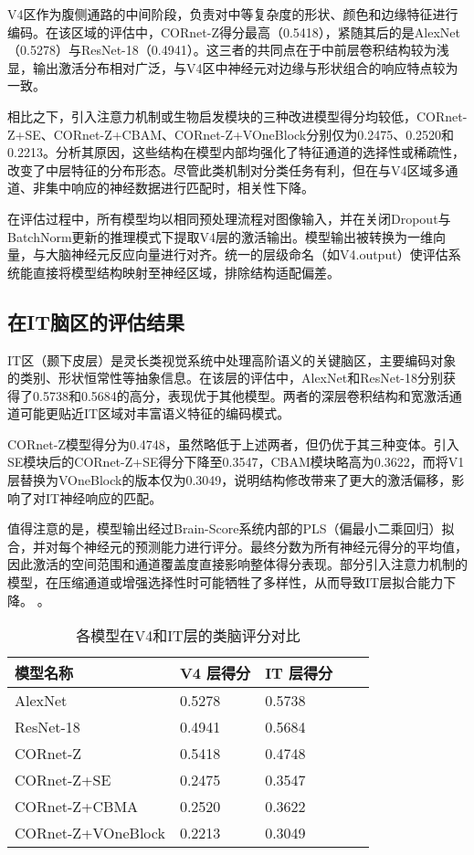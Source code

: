 V4区作为腹侧通路的中间阶段，负责对中等复杂度的形状、颜色和边缘特征进行编码。在该区域的评估中，CORnet-Z得分最高（0.5418），紧随其后的是AlexNet（0.5278）与ResNet-18（0.4941）。这三者的共同点在于中前层卷积结构较为浅显，输出激活分布相对广泛，与V4区中神经元对边缘与形状组合的响应特点较为一致。

相比之下，引入注意力机制或生物启发模块的三种改进模型得分均较低，CORnet-Z+SE、CORnet-Z+CBAM、CORnet-Z+VOneBlock分别仅为0.2475、0.2520和0.2213。分析其原因，这些结构在模型内部均强化了特征通道的选择性或稀疏性，改变了中层特征的分布形态。尽管此类机制对分类任务有利，但在与V4区域多通道、非集中响应的神经数据进行匹配时，相关性下降。

在评估过程中，所有模型均以相同预处理流程对图像输入，并在关闭Dropout与BatchNorm更新的推理模式下提取V4层的激活输出。模型输出被转换为一维向量，与大脑神经元反应向量进行对齐。统一的层级命名（如V4.output）使评估系统能直接将模型结构映射至神经区域，排除结构适配偏差。

\subsection{在IT脑区的评估结果}

IT区（颞下皮层）是灵长类视觉系统中处理高阶语义的关键脑区，主要编码对象的类别、形状恒常性等抽象信息。在该层的评估中，AlexNet和ResNet-18分别获得了0.5738和0.5684的高分，表现优于其他模型。两者的深层卷积结构和宽激活通道可能更贴近IT区域对丰富语义特征的编码模式。

CORnet-Z模型得分为0.4748，虽然略低于上述两者，但仍优于其三种变体。引入SE模块后的CORnet-Z+SE得分下降至0.3547，CBAM模块略高为0.3622，而将V1层替换为VOneBlock的版本仅为0.3049，说明结构修改带来了更大的激活偏移，影响了对IT神经响应的匹配。

值得注意的是，模型输出经过Brain-Score系统内部的PLS（偏最小二乘回归）拟合，并对每个神经元的预测能力进行评分。最终分数为所有神经元得分的平均值，因此激活的空间范围和通道覆盖度直接影响整体得分表现。部分引入注意力机制的模型，在压缩通道或增强选择性时可能牺牲了多样性，从而导致IT层拟合能力下降。
。

\begin{table}[htb]
	\centering
	\caption{各模型在V4和IT层的类脑评分对比}
	\label{tab:各模型在V4和IT层的类脑评分对比}
	\begin{tabular}{lllll}
		\hline
		模型名称& V4 层得分 & IT 层得分 \\
		\hline
		AlexNet & 0.5278 & 0.5738  \\
		ResNet-18 & 0.4941 & 0.5684  \\
		CORnet-Z & 0.5418 & 0.4748  \\
		CORnet-Z+SE  & 0.2475 & 0.3547  \\
		CORnet-Z+CBMA & 0.2520 & 0.3622  \\
		CORnet-Z+VOneBlock & 0.2213 & 0.3049  \\
		\hline
	\end{tabular}
\end{table}

